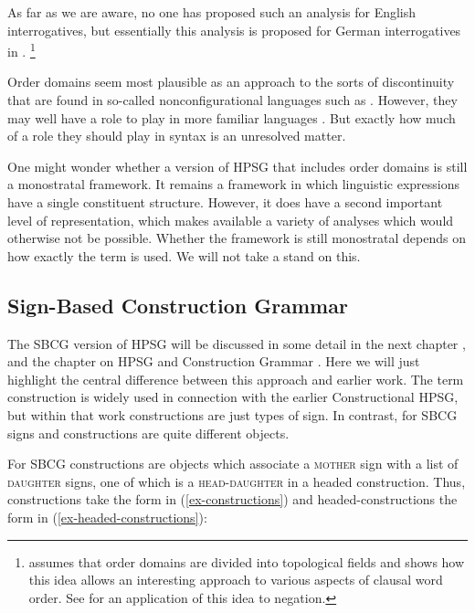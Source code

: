 \documentclass[output=paper
	        ,collection
	        ,collectionchapter
 	        ,biblatex
                ,babelshorthands
                ,newtxmath
                ,draftmode
                ,colorlinks, citecolor=brown
]{langscibook}
\begin{document}
As far as we are aware, no one has proposed such an analysis for English interrogatives, but essentially this analysis is proposed for German interrogatives in \citet[81]{Kathol2000a}.%
%
\footnote{\citet{Kathol2000a} assumes that order domains are divided into topological fields and shows how this idea allows an interesting approach to various aspects of clausal word order. See \citet{Borsley:06} for an application of this idea to negation.}
%

Order domains seem most plausible as an approach to the sorts of discontinuity that are found in so-called nonconfigurational languages such as  \citep{DS99a}. However, they may well have a role to play in more familiar languages \citep{BGM99a,Chaves2014a-u}. But exactly how much of a role they should play in syntax is an unresolved matter.

One might wonder whether a version of HPSG that includes order domains is still a monostratal framework. It remains a framework in which linguistic expressions have a single constituent structure. However, it does have a second important level of representation, which makes available a variety of analyses which would otherwise not be possible. Whether the framework is still monostratal depends on how exactly the term is used. We will not take a stand on this.

\subsection{Sign-Based Construction Grammar}\label{sec:prop7.2}
\label{prop:sec-sbcg}

The SBCG version of HPSG will be discussed in some detail in the next chapter , and the chapter on HPSG and Construction Grammar . Here we will just highlight the central difference between this approach and earlier work. The term construction is widely used in connection with the earlier Constructional HPSG, but within that work constructions are just types of sign. In contrast, for SBCG signs and constructions are quite different objects.

For SBCG constructions are objects which associate a \textsc{mother} sign with a list of \textsc{daughter} signs, one of which is a \textsc{head-daughter} in a headed construction. Thus, constructions take the form in (\ref{ex-constructions}) and headed-constructions the form in (\ref{ex-headed-constructions}):
\end{document}
